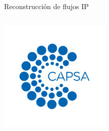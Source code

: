 \documentclass{beamer}
\begin{document}
\begin{frame}{Reconstrucción de flujos IP}
\begin{columns}
    \begin{column}{0.3\textwidth}
        \includegraphics[scale=0.6]{img/capsa.png}
    \end{column}
\end{columns}
    
\end{frame}
\end{document}
